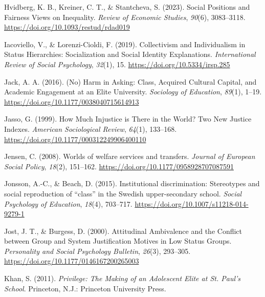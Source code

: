 \documentclass[
  letterpaper,
  DIV=11,
  numbers=noendperiod]{scrartcl}
\newlength{\cslhangindent}
\newlength{\cslentryspacingunit} %
\newenvironment{CSLReferences}[2] %
 {%
  \setlength{\parindent}{0pt}
  \ifodd #1
  \let\oldpar\par
  \def\par{\hangindent=\cslhangindent\oldpar}
  \fi
  \setlength{\parskip}{#2\cslentryspacingunit}
 }%
 {}
\begin{document}
\begin{CSLReferences}{1}{0}
\leavevmode{}%
Hvidberg, K. B., Kreiner, C. T., \& Stantcheva, S. (2023). Social
{Positions} and {Fairness Views} on {Inequality}. \emph{Review of
Economic Studies}, \emph{90}(6), 3083--3118.
\url{https://doi.org/10.1093/restud/rdad019}

\leavevmode{}%
Iacoviello, V., \& Lorenzi-Cioldi, F. (2019). Collectivism and
{Individualism} in {Status Hierarchies}: {Socialization} and {Social
Identity Explanations}. \emph{International Review of Social
Psychology}, \emph{32}(1), 15. \url{https://doi.org/10.5334/irsp.285}

\leavevmode{}%
Jack, A. A. (2016). ({No}) {Harm} in {Asking}: {Class}, {Acquired
Cultural Capital}, and {Academic Engagement} at an {Elite University}.
\emph{Sociology of Education}, \emph{89}(1), 1--19.
\url{https://doi.org/10.1177/0038040715614913}

\leavevmode{}%
Jasso, G. (1999). How {Much Injustice} is {There} in the {World}? {Two
New Justice Indexes}. \emph{American Sociological Review}, \emph{64}(1),
133--168. \url{https://doi.org/10.1177/000312249906400110}

\leavevmode{}%
Jensen, C. (2008). Worlds of welfare services and transfers.
\emph{Journal of European Social Policy}, \emph{18}(2), 151--162.
\url{https://doi.org/10.1177/0958928707087591}

\leavevmode{}%
Jonsson, A.-C., \& Beach, D. (2015). Institutional discrimination:
{Stereotypes} and social reproduction of {``class''} in the {Swedish}
upper-secondary school. \emph{Social Psychology of Education},
\emph{18}(4), 703--717. \url{https://doi.org/10.1007/s11218-014-9279-1}

\leavevmode{}%
Jost, J. T., \& Burgess, D. (2000). Attitudinal {Ambivalence} and the
{Conflict} between {Group} and {System Justification Motives} in {Low
Status Groups}. \emph{Personality and Social Psychology Bulletin},
\emph{26}(3), 293--305. \url{https://doi.org/10.1177/0146167200265003}

\leavevmode{}%
Khan, S. (2011). \emph{Privilege: {The Making} of an {Adolescent Elite}
at {St}. {Paul}'s {School}}. Princeton, N.J.: Princeton University
Press.


\end{CSLReferences}
\end{document}
